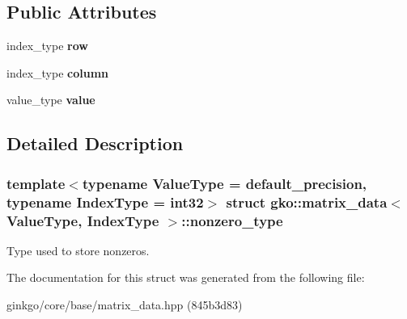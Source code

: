 \subsection*{Public Attributes}
\begin{DoxyCompactItemize}
\item 
\mbox{\label{structgko_1_1matrix__data_1_1nonzero__type_ac7c1c9c42f21f5e0c4fc19c152c1e264}} 
index\+\_\+type {\bfseries row}
\item 
\mbox{\label{structgko_1_1matrix__data_1_1nonzero__type_a29ce7fe74a417539fc3bde39507c113f}} 
index\+\_\+type {\bfseries column}
\item 
\mbox{\label{structgko_1_1matrix__data_1_1nonzero__type_ab806f40e68357159abc75dec2af18a9d}} 
value\+\_\+type {\bfseries value}
\end{DoxyCompactItemize}


\subsection{Detailed Description}
\subsubsection*{template$<$typename Value\+Type = default\+\_\+precision, typename Index\+Type = int32$>$\newline
struct gko\+::matrix\+\_\+data$<$ Value\+Type, Index\+Type $>$\+::nonzero\+\_\+type}

Type used to store nonzeros. 

The documentation for this struct was generated from the following file\+:\begin{DoxyCompactItemize}
\item 
ginkgo/core/base/matrix\+\_\+data.\+hpp (845b3d83)\end{DoxyCompactItemize}
